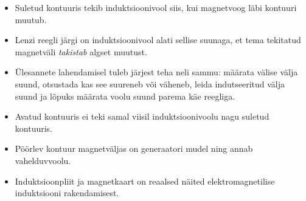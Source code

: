 \documentclass[a4paper,11pt]{article}
\begin{document}
\begin{itemize}
    \item Suletud kontuuris tekib induktsioonivool siis, kui magnetvoog läbi kontuuri muutub.
    \item Lenzi reegli järgi on induktsioonivool alati sellise suunaga, et tema tekitatud magnetväli \emph{takistab} algset muutust.
    \item Ülesannete lahendamisel tuleb järjest teha neli sammu: määrata välise välja suund, otsustada kas see suureneb või väheneb, leida indutseeritud välja suund ja lõpuks määrata voolu suund parema käe reegliga.
    \item Avatud kontuuris ei teki samal viisil induktsioonivoolu nagu suletud kontuuris.
    \item Pöörlev kontuur magnetväljas on generaatori mudel ning annab vahelduvvoolu.
    \item Induktsioonpliit ja magnetkaart on reaalsed näited elektromagnetilise induktsiooni rakendamisest.
\end{itemize}
\end{document}
